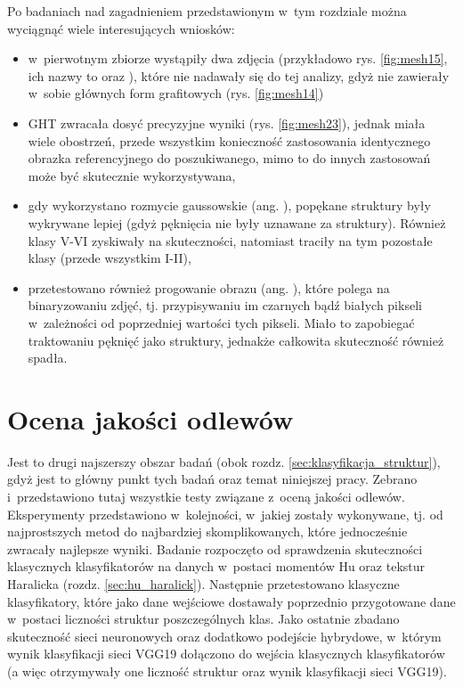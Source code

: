 Po badaniach nad zagadnieniem przedstawionym w~tym rozdziale można wyciągnąć wiele interesujących wniosków:
\begin{itemize}
	\item w~pierwotnym zbiorze wystąpiły dwa zdjęcia (przykładowo rys. \ref{fig:mesh15}, ich nazwy to  oraz ), które nie nadawały się do tej analizy, gdyż nie zawierały w~sobie głównych form grafitowych (rys. \ref{fig:mesh14})
	\item GHT zwracała dosyć precyzyjne wyniki (rys. \ref{fig:mesh23}), jednak miała wiele obostrzeń, przede wszystkim konieczność zastosowania identycznego obrazka referencyjnego do poszukiwanego, mimo to do innych zastosowań może być skutecznie wykorzystywana,
	\item gdy wykorzystano rozmycie gaussowskie (ang. ), popękane struktury były wykrywane lepiej (gdyż pęknięcia nie były uznawane za struktury). Również klasy V-VI zyskiwały na skuteczności, natomiast traciły na tym pozostałe klasy (przede wszystkim I-II),
	\item przetestowano również progowanie obrazu (ang. ), które polega na binaryzowaniu zdjęć, tj. przypisywaniu im czarnych bądź białych pikseli w~zależności od poprzedniej wartości tych pikseli. Miało to zapobiegać traktowaniu pęknięć jako struktury, jednakże całkowita skuteczność również spadła.
\end{itemize}

\section{Ocena jakości odlewów}
\label{Ocena jakości odlewów}

Jest to drugi najszerszy obszar badań (obok rozdz. \ref{sec:klasyfikacja_struktur}), gdyż jest to główny punkt tych badań oraz temat niniejszej pracy. Zebrano i~przedstawiono tutaj wszystkie testy związane z~oceną jakości odlewów. Eksperymenty przedstawiono w~kolejności, w~jakiej zostały wykonywane, tj. od najprostszych metod do najbardziej skomplikowanych, które jednocześnie zwracały najlepsze wyniki. Badanie rozpoczęto od sprawdzenia skuteczności klasycznych klasyfikatorów na danych w~postaci momentów Hu oraz tekstur Haralicka (rozdz. \ref{sec:hu_haralick}). Następnie przetestowano klasyczne klasyfikatory, które jako dane wejściowe dostawały poprzednio przygotowane dane w~postaci liczności struktur poszczególnych klas. Jako ostatnie zbadano skuteczność sieci neuronowych oraz dodatkowo podejście hybrydowe, w~którym wynik klasyfikacji sieci VGG19 dołączono do wejścia klasycznych klasyfikatorów (a więc otrzymywały one liczność struktur oraz wynik klasyfikacji sieci VGG19). 

